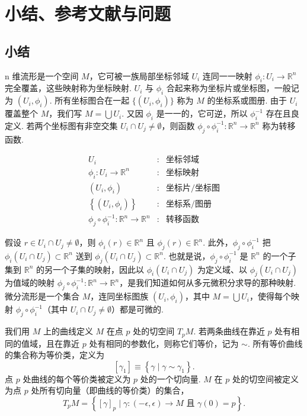 \section{小结、参考文献与问题}

\subsection{小结}

n 维流形是一个空间 $M$，它可被一族局部坐标邻域 $U_i$ 连同一一映射 $\phi_i:U_i\to\mathbb{R}^n$ 完全覆盖，这些映射称为坐标映射. $U_i$ 与 $\phi_i$ 合起来称为坐标片或坐标图，一般记为 $(U_i,\phi_i)$. 所有坐标图合在一起 $\{(U_i,\phi_i)\}$ 称为 $M$ 的坐标系或图册. 由于 $U_i$ 覆盖整个 $M$，我们写 $M=\bigcup U_i$. 又因 $\phi_i$ 是一一的，它可逆，所以 $\phi_i^{-1}$ 存在且良定义. 若两个坐标图有非空交集 $U_i\cap U_j\neq\emptyset$，则函数 $\phi_j\circ\phi_i^{-1}:\mathbb{R}^n\to\mathbb{R}^n$ 称为转移函数.

\[
\begin{array}{rcl}
U_i & : & \text{坐标邻域}\\
\phi_i:U_i\to\mathbb{R}^n & : & \text{坐标映射}\\
(U_i,\phi_i) & : & \text{坐标片/坐标图}\\
\left\{(U_i,\phi_i)\right\} & : & \text{坐标系/图册}\\
\phi_j\circ\phi_i^{-1}:\mathbb{R}^n\to\mathbb{R}^n & : & \text{转移函数}
\end{array}
\]

假设 $r\in U_i\cap U_j\neq\emptyset$，则 $\phi_i(r)\in\mathbb{R}^n$ 且 $\phi_j(r)\in\mathbb{R}^n$. 此外，$\phi_j\circ\phi_i^{-1}$ 把 $\phi_i(U_i\cap U_j)\subset\mathbb{R}^n$ 送到 $\phi_j(U_i\cap U_j)\subset\mathbb{R}^n$. 也就是说，$\phi_j\circ\phi_i^{-1}$ 是 $\mathbb{R}^n$ 的一个子集到 $\mathbb{R}^n$ 的另一个子集的映射，因此以 $\phi_i(U_i\cap U_j)$ 为定义域、以 $\phi_j(U_i\cap U_j)$ 为值域的映射 $\phi_j\circ\phi_i^{-1}:\mathbb{R}^n\to\mathbb{R}^n$，是我们知道如何从多元微积分求导的那种映射. 微分流形是一个集合 $M$，连同坐标图族 $(U_i,\phi_i)$，其中 $M=\bigcup U_i$，使得每个映射 $\phi_j\circ\phi_i^{-1}$（其中 $U_i\cap U_j\neq\emptyset$）都是可微的.

我们用 $M$ 上的曲线定义 $M$ 在点 $p$ 处的切空间 $T_pM$. 若两条曲线在靠近 $p$ 处有相同的值域，且在靠近 $p$ 处有相同的参数化，则称它们等价，记为 $\sim$. 所有等价曲线的集合称为等价类，定义为
\[
[\gamma_1]\equiv\left\{\gamma\mid\gamma\sim\gamma_1\right\}.
\]
点 $p$ 处曲线的每个等价类被定义为 $p$ 处的一个切向量. $M$ 在 $p$ 处的切空间被定义为点 $p$ 处所有切向量（即曲线的等价类）的集合，
\[
T_pM=\left\{[\gamma]_p\mid\gamma:(-\epsilon,\epsilon)\to M\text{ 且 }\gamma(0)=p\right\}.
\]


